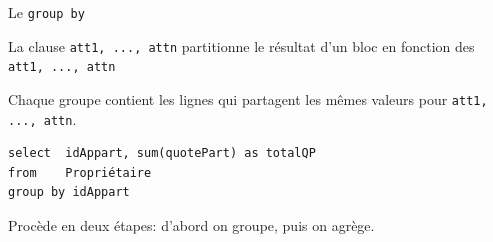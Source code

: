 \begin{frame}[fragile]{Le \texttt{group by}}

La clause  \texttt{att1, ..., attn} \alert{partitionne} le résultat d'un bloc
 en fonction des \texttt{att1, ..., attn}

\vfill 

Chaque \alert{groupe} contient les lignes qui partagent les mêmes valeurs pour \texttt{att1, ..., attn}.

\vfill

\begin{verbatim}
select  idAppart, sum(quotePart) as totalQP
from    Propriétaire
group by idAppart
\end{verbatim}

\vfill
\begin{blocgauche}
Procède en deux étapes: d'abord on groupe, puis on agrège.
\end{blocgauche}
\end{frame}


